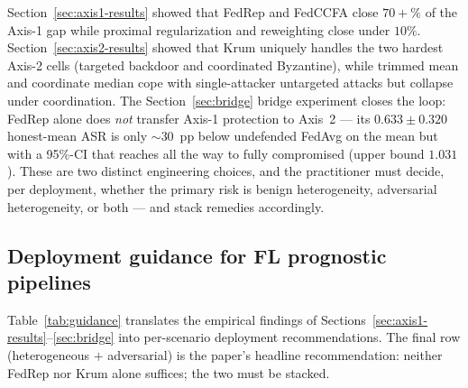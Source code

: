 \documentclass[preprint,12pt,authoryear]{elsarticle}
\begin{document}
Section~\ref{sec:axis1-results} showed that FedRep and FedCCFA close
$70+\%$ of the Axis-1 gap while proximal regularization and
reweighting close under $10\%$. Section~\ref{sec:axis2-results}
showed that Krum uniquely handles the two hardest Axis-2 cells
(targeted backdoor and coordinated Byzantine), while trimmed mean
and coordinate median cope with single-attacker untargeted attacks
but collapse under coordination. The Section~\ref{sec:bridge}
bridge experiment closes the loop: FedRep alone does \emph{not}
transfer Axis-1 protection to Axis~2 --- its $0.633 \pm 0.320$
honest-mean ASR is only $\sim 30$~pp below undefended FedAvg on the
mean but with a 95\%-CI that reaches all the way to fully
compromised (upper bound $1.031$). These are two distinct engineering
choices, and the practitioner must decide, per deployment, whether
the primary risk is benign heterogeneity, adversarial heterogeneity,
or both --- and stack remedies accordingly.

\subsection{Deployment guidance for FL prognostic pipelines}
\label{sec:discuss-guidance}

Table~\ref{tab:guidance} translates the empirical findings of
Sections~\ref{sec:axis1-results}--\ref{sec:bridge} into per-scenario
deployment recommendations. The final row (heterogeneous $+$
adversarial) is the paper's headline recommendation: neither FedRep
nor Krum alone suffices; the two must be stacked.
\end{document}
